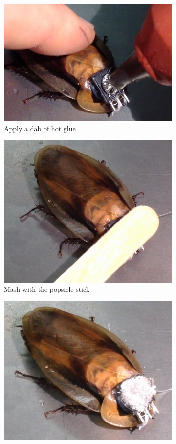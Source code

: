 \begin{figure}[ht!]
\centering
    \begin{subfigure}{.49\textwidth}
    \centering
    \includegraphics[scale=0.4]{Surgery Photos/gluewires.jpg}
    \caption{Apply a dab of hot glue}
    \label{fig:gluewires}
    \end{subfigure}
    \begin{subfigure}{.49\textwidth}
    \centering
    \includegraphics[scale=0.3]{Surgery Photos/gluewires1.jpg}
    \caption{Mash with the popsicle stick}
    \label{fig:gluewires1}
    \end{subfigure}
    \begin{subfigure}{.49\textwidth}
    \centering
    \includegraphics[scale=0.4]{Surgery Photos/gluewires2.jpg}

\end{subfigure}
\end{figure}
